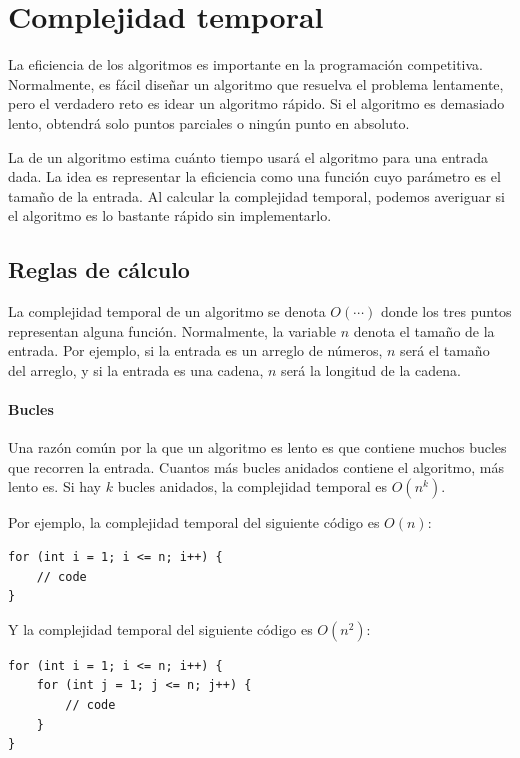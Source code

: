 \chapter{Complejidad temporal}


La eficiencia de los algoritmos es importante en la programación competitiva.
Normalmente, es fácil diseñar un algoritmo
que resuelva el problema lentamente,
pero el verdadero reto es idear un
algoritmo rápido.
Si el algoritmo es demasiado lento, obtendrá solo
puntos parciales o ningún punto en absoluto.

La  de un algoritmo
estima cuánto tiempo usará el algoritmo
para una entrada dada.
La idea es representar la eficiencia
como una función cuyo parámetro es el tamaño de la entrada.
Al calcular la complejidad temporal,
podemos averiguar si el algoritmo es lo bastante rápido
sin implementarlo.

\section{Reglas de cálculo}

La complejidad temporal de un algoritmo
se denota $O(\cdots)$
donde los tres puntos representan alguna
función.
Normalmente, la variable $n$ denota
el tamaño de la entrada.
Por ejemplo, si la entrada es un arreglo de números,
$n$ será el tamaño del arreglo,
y si la entrada es una cadena,
$n$ será la longitud de la cadena.

\subsubsection*{Bucles}

Una razón común por la que un algoritmo es lento es
que contiene muchos bucles que recorren la entrada.
Cuantos más bucles anidados contiene el algoritmo,
más lento es.
Si hay $k$ bucles anidados,
la complejidad temporal es $O(n^k)$.

Por ejemplo, la complejidad temporal del siguiente código es $O(n)$:
\begin{lstlisting}
for (int i = 1; i <= n; i++) {
    // code
}
\end{lstlisting}

Y la complejidad temporal del siguiente código es $O(n^2)$:
\begin{lstlisting}
for (int i = 1; i <= n; i++) {
    for (int j = 1; j <= n; j++) {
        // code
    }
}
\end{lstlisting}

